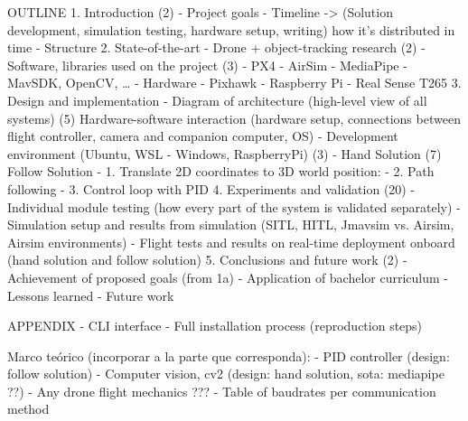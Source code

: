 OUTLINE
1. Introduction (2)
 	- Project goals
	- Timeline -> (Solution development, simulation testing, hardware setup, writing) how it's distributed in time
	- Structure
2. State-of-the-art
	- Drone + object-tracking research (2)
	- Software, libraries used on the project (3)
		- PX4
		- AirSim
		- MediaPipe
		- MavSDK, OpenCV, …
	- Hardware
	    - Pixhawk
	    - Raspberry Pi
	    - Real Sense T265
3. Design and implementation
	- Diagram of architecture (high-level view of all systems) (5)
      Hardware-software interaction (hardware setup, connections between flight controller, camera and companion computer, OS)
	- Development environment (Ubuntu, WSL - Windows, RaspberryPi) (3)
	- Hand Solution (7)
      Follow Solution
	     - 1. Translate 2D coordinates to 3D world position:
	     - 2. Path following
	     - 3. Control loop with PID
4. Experiments and validation (20)
	- Individual module testing (how every part of the system is validated separately)
	- Simulation setup and results from simulation (SITL, HITL, Jmavsim vs. Airsim, Airsim environments)
	- Flight tests and results on real-time deployment onboard (hand solution and follow solution)
5. Conclusions and future work (2)
	- Achievement of proposed goals (from 1a)
	- Application of bachelor curriculum
	- Lessons learned
	- Future work

APPENDIX
	- CLI interface
	- Full installation process (reproduction steps)
	
Marco teórico (incorporar a la parte que corresponda):
 - PID controller (design: follow solution)
 - Computer vision, cv2 (design: hand solution, sota: mediapipe ??)
 - Any drone flight mechanics ???
 - Table of baudrates per communication method